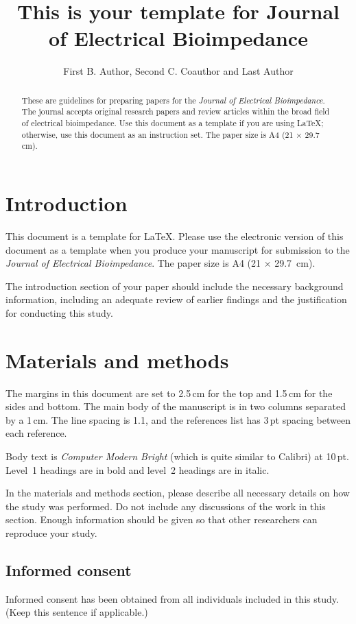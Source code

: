 \documentclass{elbioimp2}
\title{This is your template for Journal of Electrical Bioimpedance}
\author{First B. Author\affiliation{Department, University, City,
    Country}, Second C. Coauthor\affiliation{Company, City,
    Country} and Last Author\affiliation{E-mail any correspondence to:
  myname@domain.com}}
\begin{document}
\maketitle

\begin{abstract}
  These are guidelines for preparing papers for the \emph{Journal of
  Electrical Bioimpedance}. The journal accepts original research
  papers and review articles within the broad field of electrical
  bioimpedance. Use this document as a template if you are using
  \LaTeX; otherwise, use this document as an
  instruction set. The paper size is A4 (21 × 29.7\,cm).  

\end{abstract}

\section{Introduction}
This document is a template for \LaTeX. 
Please use the electronic version of this document as a
template when you produce your manuscript for submission to the
\emph{Journal of Electrical Bioimpedance}. The paper size is A4 (21 × 
29.7~cm).

The introduction section of your paper should include the necessary
background information, including an adequate review of earlier
findings and the justification for conducting this study.

\section{Materials and methods}
The margins in this document are set to 2.5\,cm for the top and 1.5\,cm
for the sides and bottom. The main body of the manuscript is in two
columns separated by a 1\,cm. The line spacing is 1.1, and the
references list has 3\,pt spacing between each reference.

Body text is \emph{Computer Modern Bright} (which is quite similar to
Calibri) at 10\,pt. Level~1 headings are in bold and level~2
headings are in italic.

In the materials and methods section, please describe all necessary
details on how the study was performed. Do not
include any discussions of the work in this section. Enough
information should be given so that other researchers can reproduce
your study.

\subsection{Informed consent}
Informed consent has been obtained from all individuals included in
this study. (Keep this sentence if applicable.)
\end{document}
